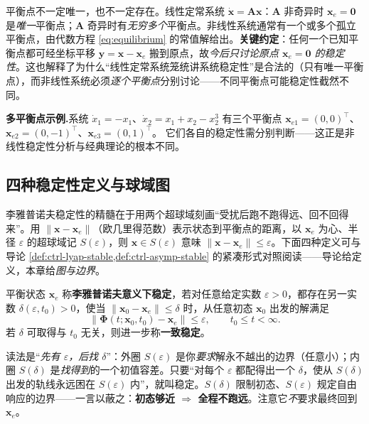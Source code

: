 \begin{insight}
平衡点不一定唯一，也不一定存在。线性定常系统 $\dot{\mathbf{x}}=\mathbf{A}\mathbf{x}$：$\mathbf{A}$ 非奇异时 $\mathbf{x}_e=\mathbf{0}$ 是\emph{唯一}平衡点；$\mathbf{A}$ 奇异时有\emph{无穷多个}平衡点。非线性系统通常有一个或多个孤立平衡点，由代数方程 \cref{eq:equilibrium} 的常值解给出。\textbf{关键约定}：任何一个已知平衡点都可经坐标平移 $\mathbf{y}=\mathbf{x}-\mathbf{x}_e$ 搬到原点，故\emph{今后只讨论原点 $\mathbf{x}_e=\mathbf{0}$ 的稳定性}。这也解释了为什么“线性定常系统笼统讲系统稳定性”是合法的（只有唯一平衡点），而非线性系统必须\emph{逐个平衡点}分别讨论——不同平衡点可能稳定性截然不同。
\end{insight}

\noindent\textbf{多平衡点示例.}\;系统 $\dot x_1=-x_1$、$\dot x_2=x_1+x_2-x_2^3$ 有三个平衡点 $\mathbf{x}_{e1}=(0,0)^\top$、$\mathbf{x}_{e2}=(0,-1)^\top$、$\mathbf{x}_{e3}=(0,1)^\top$。%
它们各自的稳定性需分别判断——这正是非线性稳定性分析与经典理论的根本不同。

\subsection{四种稳定性定义与球域图}
\label{sec:lyap-def-four}

李雅普诺夫稳定性的精髓在于用两个超球域刻画“受扰后跑不跑得远、回不回得来”。用 $\|\mathbf{x}-\mathbf{x}_e\|$（欧几里得范数）表示状态到平衡点的距离，以 $\mathbf{x}_e$ 为心、半径 $\varepsilon$ 的超球域记 $S(\varepsilon)$，则 $\mathbf{x}\in S(\varepsilon)$ 意味 $\|\mathbf{x}-\mathbf{x}_e\|\le\varepsilon$。下面四种定义可与导论 \cref{def:ctrl-lyap-stable,def:ctrl-asymp-stable} 的紧凑形式对照阅读——导论给定义，本章给\emph{图与边界}。

\begin{definition}\label{def:lyap-isl}
平衡状态 $\mathbf{x}_e$ 称\textbf{李雅普诺夫意义下稳定}，若对任意给定实数 $\varepsilon>0$，都存在另一实数 $\delta(\varepsilon,t_0)>0$，使当 $\|\mathbf{x}_0-\mathbf{x}_e\|\le\delta$ 时，从任意初态 $\mathbf{x}_0$ 出发的解满足
\begin{equation}
  \|\boldsymbol\Phi(t;\mathbf{x}_0,t_0)-\mathbf{x}_e\|\le\varepsilon,\qquad t_0\le t<\infty.
  \label{eq:lyap-isl}
\end{equation}
若 $\delta$ 可取得与 $t_0$ 无关，则进一步称\textbf{一致稳定}。
\end{definition}

\begin{insight}
读法是“\emph{先有 $\varepsilon$，后找 $\delta$}”：外圈 $S(\varepsilon)$ 是你\emph{要求}解永不越出的边界（任意小）；内圈 $S(\delta)$ 是\emph{找得到}的一个初值容差。只要“对每个 $\varepsilon$ 都配得出一个 $\delta$，使从 $S(\delta)$ 出发的轨线永远困在 $S(\varepsilon)$ 内”，就叫稳定。$S(\delta)$ 限制初态、$S(\varepsilon)$ 规定自由响应的边界——一言以蔽之：\textbf{初态够近 $\Rightarrow$ 全程不跑远}。注意它\emph{不}要求最终回到 $\mathbf{x}_e$。
\end{insight}

